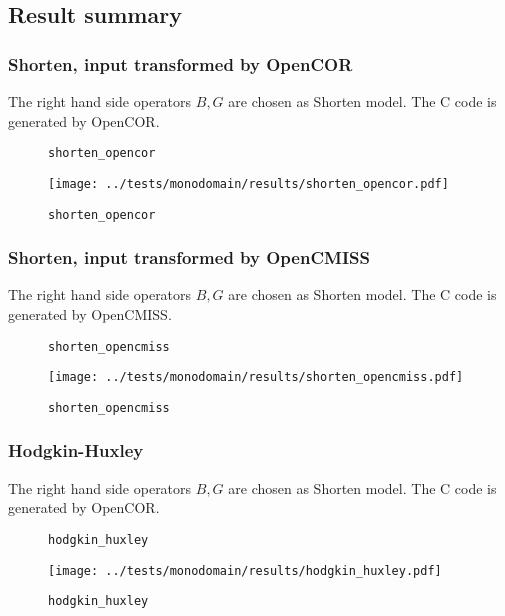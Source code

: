 \subsection{Result summary}
%
\subsubsection{Shorten, input transformed by OpenCOR}
The right hand side operators $B,G$ are chosen as Shorten model. The C code is generated by OpenCOR.
%
\begin{figure}[h!]
  \caption{\lstinline{shorten_opencor}}
\end{figure} 
%
\begin{figure}[t]%
  \centering%
  \texttt{[image: ../tests/monodomain/results/shorten\_opencor.pdf]}%
  \caption{\lstinline{shorten_opencor}}
\end{figure}%
%



\subsubsection{Shorten, input transformed by OpenCMISS}
The right hand side operators $B,G$ are chosen as Shorten model. The C code is generated by OpenCMISS.
%
  \begin{figure}[h!]
    \caption{\lstinline{shorten_opencmiss}}
  \end{figure}
%
\begin{figure}[t]%
  \centering%
  \texttt{[image: ../tests/monodomain/results/shorten\_opencmiss.pdf]}%
  \caption{\lstinline{shorten_opencmiss}}
\end{figure}%
%


\subsubsection{Hodgkin-Huxley}
The right hand side operators $B,G$ are chosen as Shorten model. The C code is generated by OpenCOR.
%
  \begin{figure}[h!]
    \caption{\lstinline{hodgkin_huxley}}
  \end{figure} 
%
\begin{figure}[t]%
  \centering%
  \texttt{[image: ../tests/monodomain/results/hodgkin\_huxley.pdf]}%
  \caption{\lstinline{hodgkin_huxley}}
\end{figure}%
%

